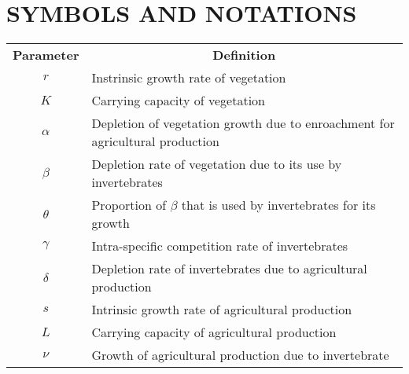 \documentclass[12pt,a4wide]{report}
\numberwithin{equation}{chapter}
\numberwithin{theorem}{chapter}
\begin{document}
\tableofcontents
\listoffigures
\newpage
\section*{SYMBOLS AND NOTATIONS}
\begin{table}[htp!]
	\renewcommand{\arraystretch}{2}
	\begin{center}
		\begin{tabular}{c p{12cm}}
		
			\textbf{Parameter} & \multicolumn{1}{c}{\textbf{Definition}}\\
			$r$ & Instrinsic growth rate of vegetation\\
			
			$K$ & Carrying capacity of vegetation\\
			
			$\alpha$ & Depletion of vegetation growth due to enroachment for agricultural production\\
			
			$\beta$ & Depletion rate of vegetation due to its use by invertebrates\\
			
			$\theta$ & Proportion of $\beta$ that is used by invertebrates for its growth\\
		    
			$\gamma$ & Intra-specific competition rate of invertebrates\\
		    
			$\delta$ & Depletion rate of invertebrates due to agricultural production\\
		    
			$s$ & Intrinsic growth rate of agricultural production\\
			
			$L$ & Carrying capacity of agricultural production\\
			
			$\nu$ & Growth of agricultural production due to invertebrate\\
		
		\end{tabular}\\
	\end{center}
\end{table}
\setcounter{page}{1}
\setcounter{chapter}{0}
\end{document}
